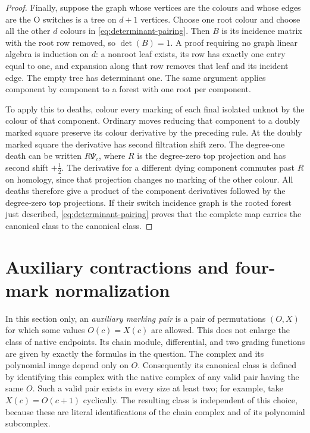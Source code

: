 \documentclass[11pt,a4paper]{article}
\theoremstyle{remark}
\begin{document}
\begin{proof}
Finally, suppose the graph whose vertices are the colours and whose
edges are the O switches is a tree on $d+1$ vertices.  Choose one root
colour and choose all the other $d$ colours in
\eqref{eq:determinant-pairing}.  Then $B$ is its incidence matrix with
the root row removed, so $\det(B)=1$.  A proof requiring no graph
linear algebra is induction on $d$: a nonroot leaf exists, its row has
exactly one entry equal to one, and expansion along that row removes
that leaf and its incident edge.  The empty tree has determinant one.
The same argument applies component by component to a forest with one
root per component.

To apply this to deaths, colour every marking of each final isolated
unknot by the colour of that component.  Ordinary moves reducing that
component to a doubly marked square preserve its colour derivative by
the preceding rule.  At the doubly marked square the derivative has
second filtration shift zero.  The degree-one death can be written
$R\Psi_c$, where $R$ is the degree-zero top projection and has second
shift $+\tfrac12$.  The derivative for a different dying component
commutes past $R$ on homology, since that projection changes no marking
of the other colour.  All deaths therefore give a product of the
component derivatives followed by the degree-zero top projections.
If their switch incidence graph is the rooted forest just described,
\eqref{eq:determinant-pairing} proves that the complete map carries the
canonical class to the canonical class.

\end{proof}


\section{Auxiliary contractions and four-mark normalization}
\label{sec:aux-death}

In this section only, an \emph{auxiliary marking pair} is a pair of
permutations $(O,X)$ for which some values $O(c)=X(c)$ are allowed.  This
does not enlarge the class of native endpoints.  Its chain module,
differential, and two grading functions are given by exactly the formulas
in the question.  The complex and its polynomial image depend only on
$O$.  Consequently its canonical class is defined by identifying this
complex with the native complex of any valid pair having the same $O$.
Such a valid pair exists in every size at least two; for example, take
$X(c)=O(c+1)$ cyclically.  The resulting class is independent of this
choice, because these are literal identifications of the chain complex
and of its polynomial subcomplex.
\end{document}
